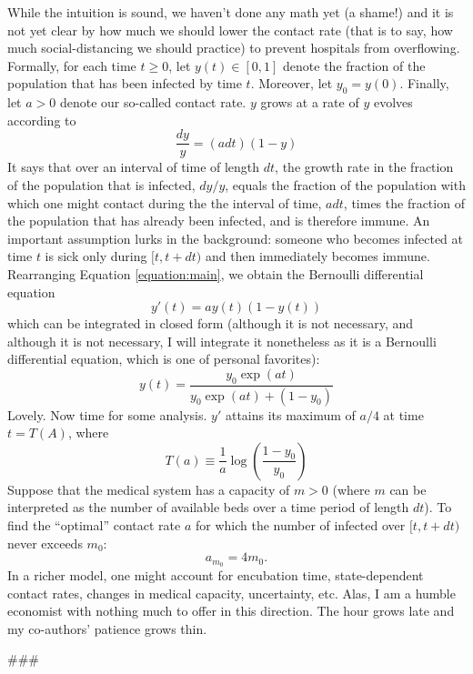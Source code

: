 \documentclass[12pt]{article}
\begin{document}
While the intuition is sound, we haven't done any math yet (a shame!) and it is not yet clear by how much we should lower the contact rate (that is to say, how much social-distancing we should practice) to prevent hospitals from overflowing. Formally, for each time $t\geq0$, let $y(t)\in[0,1]$ denote the fraction of the population that has been infected by time $t$. Moreover, let $y_{0}=y(0)$. Finally, let $a>0$ denote our so-called contact rate. $y$ grows at a rate of
$y$ evolves according to
\begin{equation}\label{equation:main}
	\frac{dy}{y}=(adt)(1-y)
\end{equation}
It says that over an interval of time of length $dt$, the growth rate in the fraction of the population that is infected, $dy/y$, equals the fraction of the population with which one might contact during the the interval of time, $a dt$, times the fraction of the population that has already been infected, and is therefore immune. An important assumption lurks in the background: someone who becomes infected at time $t$ is sick only during $[t,t+dt)$ and then immediately becomes immune. Rearranging Equation \ref{equation:main}, we obtain the Bernoulli differential equation 
\begin{equation}
	y'(t)=ay(t)(1-y(t))
\end{equation} 
which can be integrated in closed form (although it is not necessary, and although it is not necessary, I will integrate it nonetheless as it is a Bernoulli differential equation, which is one of personal favorites):
\begin{equation}
	y(t)=\frac{y_{0}\exp(at)}{y_{0}\exp(at)+(1-y_{0})}
\end{equation}
Lovely. Now time for some analysis. $y'$ attains its maximum of $a/4$ at time $t=T(A)$, where
\begin{equation}
	T(a)\equiv\frac{1}{a}\log\left(\frac{1-y_{0}}{y_{0}}\right)
\end{equation}
Suppose that the medical system has a capacity of $m>0$ (where $m$ can be interpreted as the number of available beds over a time period of length $dt$). To find the ``optimal'' contact rate $a$ for which the number of infected over $[t,t+dt)$ never exceeds $m_{0}$:
\begin{equation}
	a_{m_{0}}=4m_{0}.
\end{equation}
In a richer model, one might account for encubation time, state-dependent contact rates, changes in medical capacity, uncertainty, etc. Alas, I am a humble economist with nothing much to offer in this direction. The hour grows late and my co-authors' patience grows thin.
\begin{center}
	\#\#\#
\end{center}
\end{document}
